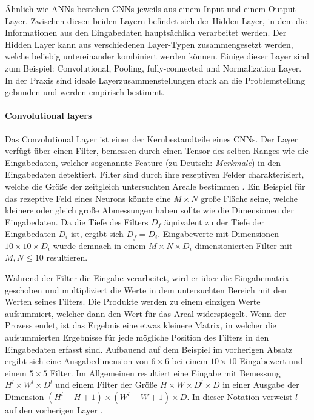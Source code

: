 \"Ahnlich wie ANNs bestehen CNNs jeweils aus einem Input und einem Output Layer. Zwischen diesen beiden Layern befindet sich der Hidden Layer, in dem die Informationen aus den Eingabedaten haupts\"achlich verarbeitet werden. Der Hidden Layer kann aus verschiedenen Layer-Typen zusammengesetzt werden, welche beliebig untereinander kombiniert werden k\"onnen. Einige dieser Layer sind zum Beispiel: Convolutional, Pooling, fully-connected und Normalization Layer. In der Praxis sind ideale Layerzusammenstellungen stark an die Problemstellung gebunden und werden empirisch bestimmt. 

\paragraph{Convolutional layers}

Das Convolutional Layer ist einer der Kernbestandteile eines CNNs. Der Layer verf\"ugt \"uber einen Filter, bemessen durch einen Tensor des selben Ranges wie die Eingabedaten, welcher sogenannte Feature (zu Deutsch: \textit{Merkmale}) in den Eingabedaten detektiert. Filter sind durch ihre rezeptiven Felder charakterisiert, welche die Gr\"o\ss{}e der zeitgleich untersuchten Areale bestimmen \parencite{DBLP:journals/corr/OSheaN15}. Ein Beispiel f\"ur das rezeptive Feld eines Neurons k\"onnte eine $M \times N$ große Fl\"ache seine, welche kleinere oder gleich gro\ss{}e Abmessungen haben sollte wie die Dimensionen der Eingabedaten. Da die Tiefe des Filters $D_f$ \"aquivalent zu der Tiefe der Eingabedaten $D_i$ ist, ergibt sich $D_f = D_i$. Eingabewerte mit Dimensionen $10 \times 10 \times D_i$ w\"urde demnach in einem $M \times N \times D_i$ dimensionierten Filter mit $M, N \leq 10$ resultieren. 

Während der Filter die Eingabe verarbeitet, wird er \"uber die Eingabematrix geschoben und multipliziert die Werte in dem untersuchten Bereich mit den Werten seines Filters. Die Produkte werden zu einem einzigen Werte aufsummiert, welcher dann den Wert f\"ur das Areal widerspiegelt. Wenn der Prozess endet, ist das Ergebnis eine etwas kleinere Matrix, in welcher die aufsummierten Ergebnisse f\"ur jede m\"ogliche Position des Filters in den Eingabedaten erfasst sind. Aufbauend auf dem Beispiel im vorherigen Absatz ergibt sich eine Ausgabedimension von $6\times6$ bei einem $10\times10$ Eingabewert und einem $5\times5$ Filter. Im Allgemeinen resultiert eine Eingabe mit Bemessung $H^l \times W^l \times D^l$ und einem Filter der Gr\"o\ss{}e $H \times W \times D^l \times D$ in einer Ausgabe der Dimension $(H^l - H + 1) \times (W^l - W + 1) \times D$. In dieser Notation verweist $l$ auf den vorherigen Layer \parencite{Wu.2017}.

